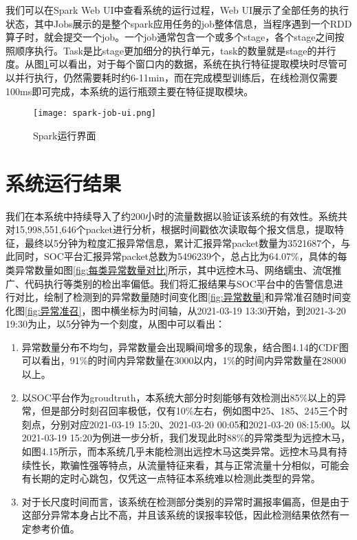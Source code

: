 我们可以在Spark Web UI中查看系统的运行过程，Web UI展示了全部任务的执行状态，其中Jobs展示的是整个spark应用任务的job整体信息，当程序遇到一个RDD算子时，就会提交一个job。一个job通常包含一个或多个stage，各个stage之间按照顺序执行。Task是比stage更加细分的执行单元，task的数量就是stage的并行度。从图\ref{fig:spark-job}可以看出，对于每个窗口内的数据，系统在执行特征提取模块时尽管可以并行执行，仍然需要耗时约6-11min，而在完成模型训练后，在线检测仅需要100ms即可完成，本系统的运行瓶颈主要在特征提取模块。
\begin{figure}
  \centering
  \texttt{[image: spark-job-ui.png]}
  \caption{Spark运行界面}
  \label{fig:spark-job}
\end{figure}

\section{系统运行结果}
我们在本系统中持续导入了约200小时的流量数据以验证该系统的有效性。系统共对15,998,551,646个packet进行分析，根据时间戳依次读取每个报文信息，提取特征，最终以5分钟为粒度汇报异常信息，累计汇报异常packet数量为3521687个，与此同时，SOC平台汇报异常packet总数为5496239个，总占比为64.07\%，具体的每类异常数量如图\ref{fig:每类异常数量对比}所示，其中远控木马、网络蠕虫、流氓推广、代码执行等类别的检出率偏低。我们将汇报结果与SOC平台中的告警信息进行对比，绘制了检测到的异常数量随时间变化图\ref{fig:异常数量}和异常准召随时间变化图\ref{fig:异常准召}，图中横坐标为时间轴，从2021-03-19 13:30开始，到2021-3-20 19:30为止，以5分钟为一个刻度，从图中可以看出：
\begin{enumerate}
  \item 异常数量分布不均匀，异常数量会出现瞬间增多的现象，结合图4.14的CDF图可以看出，91\%的时间内异常数量在3000以内，1\%的时间内异常数量在28000以上。
  \item 以SOC平台作为groudtruth，本系统大部分时刻能够有效检测出85\%以上的异常，但是部分时刻召回率极低，仅有10\%左右，例如图中25、185、245三个时刻点，分别对应2021-03-19 15:20、2021-03-20 00:05和2021-03-20 08:15:00。以2021-03-19 15:20为例进一步分析，我们发现此时88\%的异常类型为远控木马，如图4.15所示，而本系统几乎未能检测出远控木马这类异常。远控木马具有持续性长，欺骗性强等特点，从流量特征来看，其与正常流量十分相似，可能会有长期的定时心跳包，仅凭这一点特征本系统难以检测此类型的异常。
  \item 对于长尺度时间而言，该系统在检测部分类别的异常时漏报率偏高，但是由于这部分异常本身占比不高，并且该系统的误报率较低，因此检测结果依然有一定参考价值。
\end{enumerate}

